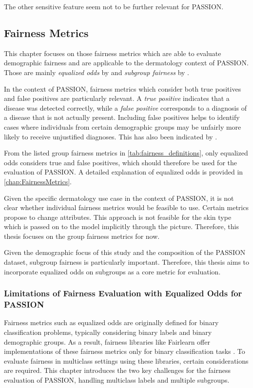 \documentclass[12pt, a4paper, oneside]{book}   	%
\begin{document}
			The other sensitive feature seem not to be further relevant for PASSION.
		
		\subsection{Fairness Metrics} \label{chap:ContextFairnessMetrics}
		This chapter focuses on those fairness metrics which are able to evaluate demographic fairness and are applicable to the dermatology context of PASSION.	Those are mainly \textit{equalized odds} by \textcite{M63_Hardt_2016} and \textit{subgroup fairness} by \textcite{M79_Kearns_2018}.
		
		In the context of PASSION, fairness metrics which consider both true positives and false positives are particularly relevant. A \textit{true positive} indicates that a disease was detected correctly, while a \textit{false positive} corresponds to a diagnosis of a disease that is not actually present. Including false positives helps to identify cases where individuals from certain demographic groups may be unfairly more likely to receive unjustified diagnoses. This has also been indicated by \textcite{Sabato_2024}.
		
		From the listed group fairness metrics in \autoref{tab:fairness_definitions}, only equalized odds considers true and false positives, which should therefore be used for the evaluation of PASSION. A detailed explanation of equalized odds is provided in \autoref{chap:FairnessMetrics}.
		
		Given the specific dermatology use case in the context of PASSION, it is not clear whether individual fairness metrics would be feasible to use. Certain metrics propose to change attributes. This approach is not feasible for the skin type which is passed on to the model implicitly through the picture. Therefore, this thesis focuses on the group fairness metrics for now.
		
		Given the demographic focus of this study and the composition of the PASSION dataset, subgroup fairness is particularly important. Therefore, this thesis aims to incorporate equalized odds on subgroups as a core metric for evaluation.
		
		\subsubsection{Limitations of Fairness Evaluation with Equalized Odds for PASSION}
		Fairness metrics such as equalized odds are originally defined for binary classification problems, typically considering binary labels and binary demographic groups. As a result, fairness libraries like \gls{Fairlearn} offer implementations of these fairness metrics only for binary classification tasks \autocite{Fairlearn_nodate}. To evaluate fairness in multiclass settings using these libraries, certain considerations are required. This chapter introduces the two key challenges for the fairness evaluation of PASSION, handling multiclass labels and multiple subgroups.
		
\end{document}
